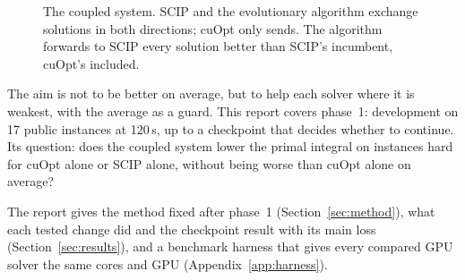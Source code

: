 \begin{figure}[t]\centering
{}
\caption{The coupled system. SCIP and the evolutionary algorithm exchange solutions in both directions; cuOpt only
sends. The algorithm forwards to SCIP every solution better than SCIP's incumbent, cuOpt's included.}\label{fig:system}
\end{figure}

The aim is not to be better on average, but to help each solver where it is weakest, with the average as a guard.
This report covers phase~1: development on 17 public instances at 120\,s, up to a checkpoint that decides whether to
continue. Its question: does the coupled system lower the primal integral on instances hard for cuOpt alone or SCIP
alone, without being worse than cuOpt alone on average?

The report gives the method fixed after phase~1 (Section~\ref{sec:method}), what each tested change did and the
checkpoint result with its main loss (Section~\ref{sec:results}), and a benchmark harness that gives every compared GPU
solver the same cores and GPU (Appendix~\ref{app:harness}).
\FloatBarrier
